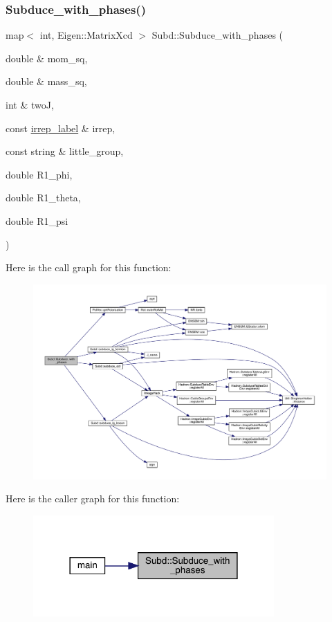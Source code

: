\subsubsection{\texorpdfstring{Subduce\_with\_phases()}{Subduce\_with\_phases()}}
{\footnotesize\ttfamily map$<$ int, Eigen\+::\+Matrix\+Xcd $>$ Subd\+::\+Subduce\+\_\+with\+\_\+phases (\begin{DoxyParamCaption}\item[{double \&}]{mom\+\_\+sq,  }\item[{double \&}]{mass\+\_\+sq,  }\item[{int \&}]{twoJ,  }\item[{const \mbox{\hyperlink{structirrep__label}{irrep\+\_\+label}} \&}]{irrep,  }\item[{const string \&}]{little\+\_\+group,  }\item[{double}]{R1\+\_\+phi,  }\item[{double}]{R1\+\_\+theta,  }\item[{double}]{R1\+\_\+psi }\end{DoxyParamCaption})}

Here is the call graph for this function\+:
\nopagebreak
\begin{figure}[H]
\begin{center}
\leavevmode
\includegraphics[width=350pt]{d8/d2b/namespaceSubd_a859ba9599493e5fa5957acedc92dd964_cgraph}
\end{center}
\end{figure}
Here is the caller graph for this function\+:
\nopagebreak
\begin{figure}[H]
\begin{center}
\leavevmode
\includegraphics[width=261pt]{d8/d2b/namespaceSubd_a859ba9599493e5fa5957acedc92dd964_icgraph}
\end{center}
\end{figure}


